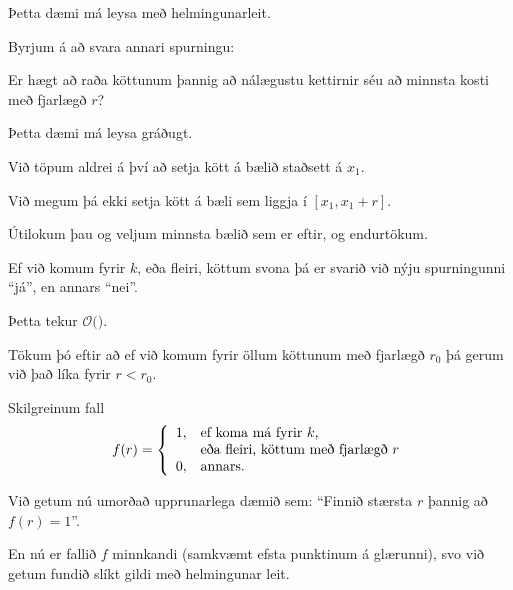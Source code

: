 {
	{
		\item<1-> Þetta dæmi má leysa með helmingunarleit.
		\item<2-> Byrjum á að svara annari spurningu:
		{
			\item<3-> Er hægt að raða köttunum þannig að nálægustu kettirnir séu að minnsta kosti með fjarlægð $r$?
		}
		\item<4-> Þetta dæmi má leysa gráðugt.
		\item<5-> Við töpum aldrei á því að setja kött á bælið staðsett á $x_1$.
		\item<6-> Við megum þá ekki setja kött á bæli sem liggja í $[x_1, x_1 + r]$.
		\item<7-> Útilokum þau og veljum minnsta bælið sem er eftir, og endurtökum.
		\item<8-> Ef við komum fyrir $k$, eða fleiri, köttum svona þá er svarið við nýju spurningunni ``já'', en annars ``nei''.
		\item<9-> Þetta tekur $\mathcal{O}($\onslide<10->{$n + k$}$)$.
	}
}

{
	{
		\item<1-> Tökum þó eftir að ef við komum fyrir öllum köttunum með fjarlægð $r_0$ þá gerum við það líka fyrir $r < r_0$.
		\item<2-> Skilgreinum fall
		\[
			f(r) = \left \{ \begin{array}{l l}
			1, & \text{ef koma má fyrir $k$,}\\
			  & \text{eða fleiri, köttum með fjarlægð $r$}\\
			0, & \text{annars}.
			\end{array}
			\right .
		\]
		\item<3-> Við getum nú umorðað upprunarlega dæmið sem: ``Finnið stærsta $r$ þannig að $f(r) = 1$''.
		\item<4-> En nú er fallið $f$ minnkandi (samkvæmt efsta punktinum á glærunni), svo við getum fundið slíkt gildi með helmingunar leit.
	}
}

